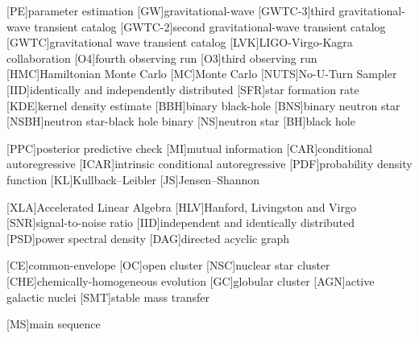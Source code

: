[PE]{parameter estimation}
[GW]{gravitational-wave}
[GWTC-3]{third gravitational-wave transient catalog}
[GWTC-2]{second gravitational-wave transient catalog}
[GWTC]{gravitational wave transient catalog}
[LVK]{LIGO-Virgo-Kagra collaboration}
[O4]{fourth observing run}
[O3]{third observing run}
[HMC]{Hamiltonian Monte Carlo}
[MC]{Monte Carlo}
[NUTS]{No-U-Turn Sampler}
[IID]{identically and independently distributed}
[SFR]{star formation rate}
[KDE]{kernel density estimate}
[BBH]{binary black-hole}
[BNS]{binary neutron star}
[NSBH]{neutron star-black hole binary}
[NS]{neutron star}
[BH]{black hole}

[PPC]{posterior predictive check}
[MI]{mutual information}
[CAR]{conditional autoregressive}
[ICAR]{intrinsic conditional autoregressive}
[PDF]{probability density function}
[KL]{Kullback--Leibler}
[JS]{Jensen--Shannon}

[XLA]{Accelerated Linear Algebra}
[HLV]{Hanford, Livingston and Virgo}
[SNR]{signal-to-noise ratio}
[IID]{independent and identically distributed}
[PSD]{power spectral density}
[DAG]{directed acyclic graph}

% 
%
[CE]{common-envelope}
[OC]{open cluster}
[NSC]{nuclear star cluster}
[CHE]{chemically-homogeneous evolution}
[GC]{globular cluster}
[AGN]{active galactic nuclei}
[SMT]{stable mass transfer}

[MS]{main sequence}


